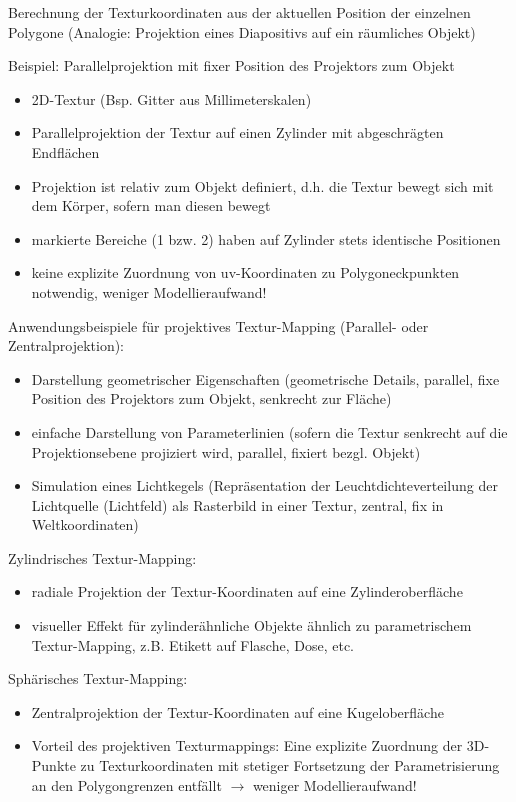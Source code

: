 \documentclass[10pt,landscape]{article}
\begin{document}
\begin{multicols}{3}
Berechnung der Texturkoordinaten aus der aktuellen Position der einzelnen Polygone (Analogie: Projektion eines Diapositivs auf ein räumliches Objekt)

Beispiel: Parallelprojektion mit fixer Position des Projektors zum Objekt
\begin{itemize}
  \item 2D-Textur (Bsp. Gitter aus Millimeterskalen)
  \item Parallelprojektion der Textur auf einen Zylinder mit abgeschrägten Endflächen
  \item Projektion ist relativ zum Objekt definiert, d.h. die Textur bewegt sich mit dem Körper, sofern man diesen bewegt
  \item markierte Bereiche (1 bzw. 2) haben auf Zylinder stets identische Positionen
  \item keine explizite Zuordnung von uv-Koordinaten zu Polygoneckpunkten notwendig, weniger Modellieraufwand!
\end{itemize}

Anwendungsbeispiele für projektives Textur-Mapping (Parallel- oder Zentralprojektion):
\begin{itemize}
  \item Darstellung geometrischer Eigenschaften (geometrische Details, parallel, fixe Position des Projektors zum Objekt, senkrecht zur Fläche)
  \item einfache Darstellung von Parameterlinien (sofern die Textur senkrecht auf die Projektionsebene projiziert wird, parallel, fixiert bezgl. Objekt)
  \item Simulation eines Lichtkegels (Repräsentation der Leuchtdichteverteilung der Lichtquelle (Lichtfeld) als Rasterbild in einer Textur, zentral, fix in Weltkoordinaten)
\end{itemize}

Zylindrisches Textur-Mapping:
\begin{itemize}
  \item radiale Projektion der Textur-Koordinaten auf eine Zylinderoberfläche
  \item visueller Effekt für zylinderähnliche Objekte ähnlich zu parametrischem Textur-Mapping, z.B. Etikett auf Flasche, Dose, etc.
\end{itemize}

Sphärisches Textur-Mapping:
\begin{itemize}
  \item Zentralprojektion der Textur-Koordinaten auf eine Kugeloberfläche
  \item Vorteil des projektiven Texturmappings: Eine explizite Zuordnung der 3D-Punkte zu Texturkoordinaten mit stetiger Fortsetzung der Parametrisierung an den Polygongrenzen entfällt $\rightarrow$ weniger Modellieraufwand!
\end{itemize}


\end{multicols}
\end{document}
